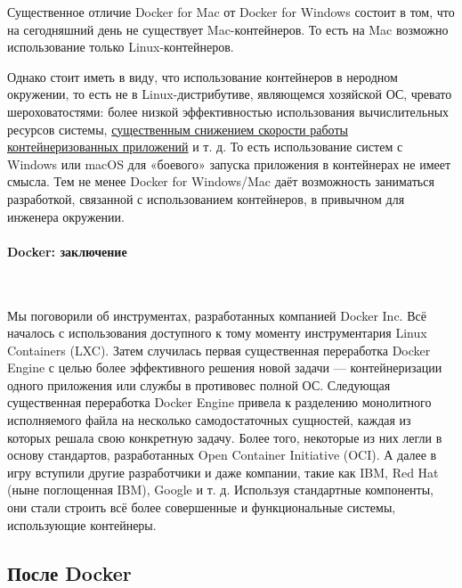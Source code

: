 \documentclass[14pt, a4paper]{article}
\begin{document}
Существенное отличие Docker for Mac от Docker for Windows состоит в том, что на сегодняшний день
не существует Mac-контейнеров. То есть на Mac возможно использование только Linux-контейнеров.

Однако стоит иметь в виду, что использование контейнеров в неродном окружении, то есть не в
Linux-дистрибутиве, являющемся хозяйской ОС, чревато шероховатостями: более низкой
эффективностью использования вычислительных ресурсов системы, \href{https://github.com/docker/for-mac/issues/77}{существенным снижением
скорости работы контейнеризованных приложений} и т. д. То есть использование систем с Windows
или macOS для «боевого» запуска приложения в контейнерах не имеет смысла. Тем не менее Docker
for Windows/Mac даёт возможность заниматься разработкой, связанной с использованием
контейнеров, в привычном для инженера окружении.\\


\paragraph*{Docker: заключение} \mbox{}\\

Мы поговорили об инструментах, разработанных компанией Docker Inc. Всё началось с использования
доступного к тому моменту инструментария Linux Containers (LXC). Затем случилась первая
существенная переработка Docker Engine с целью более эффективного решения новой задачи —
контейнеризации одного приложения или службы в противовес полной ОС. Следующая существенная
переработка Docker Engine привела к разделению монолитного исполняемого файла на несколько
самодостаточных сущностей, каждая из которых решала свою конкретную задачу. Более того,
некоторые из них легли в основу стандартов, разработанных Open Container Initiative (OCI). А далее в
игру вступили другие разработчики и даже компании, такие как IBM, Red Hat (ныне поглощенная IBM),
Google и т. д. Используя стандартные компоненты, они стали строить всё более совершенные и
функциональные системы, использующие контейнеры.\\


\subsection*{После Docker}
\end{document}

